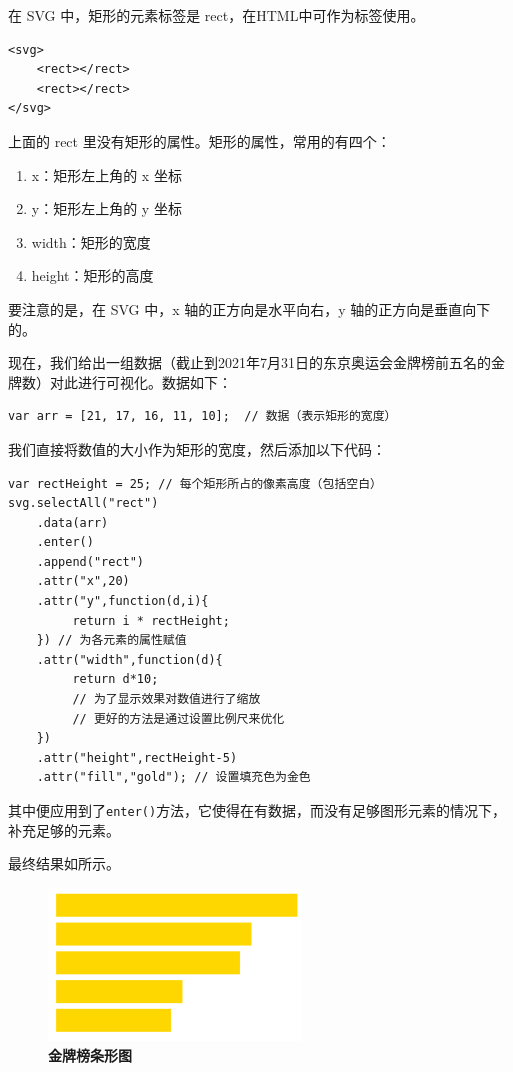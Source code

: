 在 SVG 中，矩形的元素标签是 rect，在HTML中可作为标签使用。

\begin{verbatim}
<svg>
    <rect></rect>
    <rect></rect>
</svg>
\end{verbatim}

上面的 rect 里没有矩形的属性。矩形的属性，常用的有四个：

\begin{enumerate}
    \item x：矩形左上角的 x 坐标
    \item y：矩形左上角的 y 坐标
    \item width：矩形的宽度
    \item height：矩形的高度
\end{enumerate}

要注意的是，在 SVG 中，x 轴的正方向是水平向右，y 轴的正方向是垂直向下的。

现在，我们给出一组数据（截止到2021年7月31日的东京奥运会金牌榜前五名的金牌数）对此进行可视化。数据如下：

\begin{verbatim}
var arr = [21, 17, 16, 11, 10];  // 数据（表示矩形的宽度）
\end{verbatim}

我们直接将数值的大小作为矩形的宽度，然后添加以下代码：

\begin{verbatim}
var rectHeight = 25; // 每个矩形所占的像素高度（包括空白）
svg.selectAll("rect")
    .data(arr)
    .enter()
    .append("rect")
    .attr("x",20)
    .attr("y",function(d,i){
         return i * rectHeight;
    }) // 为各元素的属性赋值
    .attr("width",function(d){
         return d*10;
         // 为了显示效果对数值进行了缩放
         // 更好的方法是通过设置比例尺来优化
    })
    .attr("height",rectHeight-5)
    .attr("fill","gold"); // 设置填充色为金色
\end{verbatim}

其中便应用到了\verb|enter()|方法，它使得在有数据，而没有足够图形元素的情况下，补充足够的元素。

最终结果如所示。

\begin{figure}[htbp]
    \centering
    \includegraphics[width=0.6\textwidth]{figure/D3/gold_bar_chart.png}
    \caption{\textbf{金牌榜条形图}}
    \label{fig:gold_bar_chart}
\end{figure}

